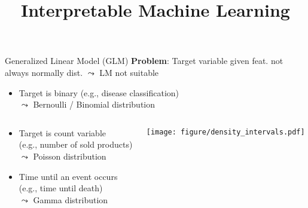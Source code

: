 \documentclass[11pt,compress,t,notes=noshow, aspectratio=169, xcolor=table]{beamer}
\title{Interpretable Machine Learning}
\date{}
\begin{document}
\newcommand{\titlefigure}{figure/logreg-2vars-surface}%
\newcommand{\learninggoals}{
\item Definition of GLMs
\item Logistic regression as example
\item Interpretation in logistic regression
}



\begin{frame}{Generalized Linear Model (GLM) }
\vspace{-0.2cm}
\textbf{Problem}: Target variable given feat. not always normally dist. $\leadsto$ LM not suitable
\begin{itemize}
    \item Target is binary (e.g., disease classification)\\
    $\leadsto$ Bernoulli / Binomial distribution
\end{itemize}
\vspace{-0.5cm}
\begin{columns}[totalwidth=\textwidth]
    \begin{column}{0.45\textwidth}
        \begin{itemize}
            \item Target is count variable \\(e.g., number of sold products)\\
            $\leadsto$ Poisson distribution
            \item Time until an event occurs\\ (e.g., time until death)\\
            $\leadsto$ Gamma distribution
        \end{itemize}
    \end{column}
    \begin{column}{0.55\textwidth}
    \vspace{-0.4cm}
        \begin{center}
            \texttt{[image: figure/density\_intervals.pdf]}
        \end{center}
    \end{column}
\end{columns}
\medskip
\pause

\end{frame}
\end{document}
